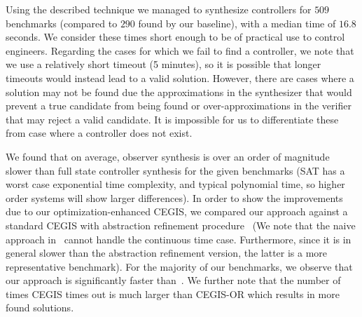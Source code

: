 \documentclass[a4paper,UKenglish]{lipics-v2018}
\begin{document}
Using the described technique we managed to synthesize controllers for $509$
benchmarks (compared to $290$ found by our baseline), with a median time of
$16.8$ seconds.
%
We consider these times short enough to be of practical use to control
engineers.  Regarding the cases for which we fail to find a controller, we
note that we use a relatively short timeout (5 minutes), so it is possible
that longer timeouts would instead lead to a valid solution.  However, there
are cases where a solution may not be found due the approximations in the
synthesizer that would prevent a true candidate from being found or
over-approximations in the verifier that may reject a valid candidate.  It
is impossible for us to differentiate these from case where a controller
does not exist.

We found that on average, observer synthesis is over an order of magnitude slower
than full state controller synthesis for the given benchmarks (SAT has
a worst case exponential time complexity, and typical polynomial time, so higher
order systems will show larger differences).
In order to show the improvements due to our optimization-enhanced CEGIS, we
compared our approach against a standard CEGIS with abstraction refinement
procedure~\cite{DBLP:conf/cav/AbateBCCDKKP17} (We note that the naive approach
in~\cite{DBLP:conf/cav/AbateBCCDKKP17} cannot handle the continuous time case.  
Furthermore, since it is in general slower than the abstraction refinement
version, the latter is a more representative benchmark).
For the majority of our benchmarks, we observe that our approach is
significantly faster than~\cite{DBLP:conf/cav/AbateBCCDKKP17}. 
We further note that the number of times CEGIS times out is much larger than
CEGIS-OR which results in more found solutions.

\end{document}
